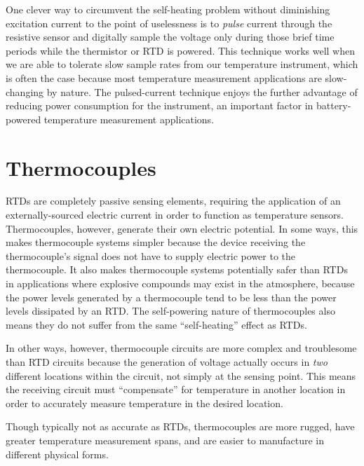 One clever way to circumvent the self-heating problem without diminishing excitation current to the point of uselessness is to \textit{pulse} current through the resistive sensor and digitally sample the voltage only during those brief time periods while the thermistor or RTD is powered.  This technique works well when we are able to tolerate slow sample rates from our temperature instrument, which is often the case because most temperature measurement applications are slow-changing by nature.  The pulsed-current technique enjoys the further advantage of reducing power consumption for the instrument, an important factor in battery-powered temperature measurement applications.








\filbreak
\section{Thermocouples}

RTDs are completely passive sensing elements, requiring the application of an externally-sourced electric current in order to function as temperature sensors.  Thermocouples, however, generate their own electric potential.  In some ways, this makes thermocouple systems simpler because the device receiving the thermocouple's signal does not have to supply electric power to the thermocouple.  It also makes thermocouple systems potentially safer than RTDs in applications where explosive compounds may exist in the atmosphere, because the power levels generated by a thermocouple tend to be less than the power levels dissipated by an RTD.  The self-powering nature of thermocouples also means they do not suffer from the same ``self-heating'' effect as RTDs.  

In other ways, however, thermocouple circuits are more complex and troublesome than RTD circuits because the generation of voltage actually occurs in \textit{two} different locations within the circuit, not simply at the sensing point.  This means the receiving circuit must ``compensate'' for temperature in another location in order to accurately measure temperature in the desired location.

Though typically not as accurate as RTDs, thermocouples are more rugged, have greater temperature measurement spans, and are easier to manufacture in different physical forms.






